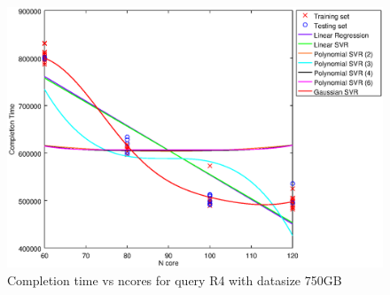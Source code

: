 
\begin {figure}[hbtp]
\centering
\includegraphics[width=\textwidth]{output/R4_750_ONLY_1_LINEAR_NCORE/plot_R4_750.eps}
\caption{Completion time vs ncores for query R4 with datasize 750GB}
\label{fig:only_1_linear_R4_750}
\end {figure}
